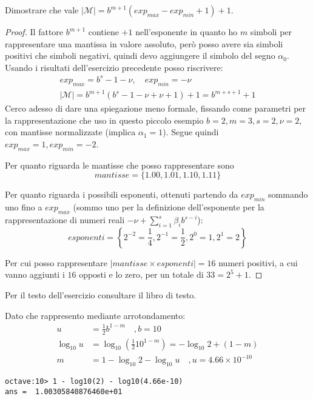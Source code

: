 \begin{exercise}
Dimostrare che vale $|\mathcal{M}| = b^{m+1}(exp_{max} - exp_{min} + 1) + 1$.
\end{exercise}
\begin{proof}
Il fattore $b^{m+1}$ contiene $+1$ nell'esponente in quanto ho $m$ simboli per
rappresentare una mantissa in valore assoluto, per\`o posso avere sia simboli positivi
che simboli negativi, quindi devo aggiungere il simbolo del segno $\alpha_{0}$.
Usando i risultati dell'esercizio precedente posso riscrivere:
\begin{displaymath}
\begin{split}
	exp_{max} = b^{s} - 1 - \nu, \quad exp_{min} = -\nu \\
	|\mathcal{M}| = b^{m+1}(b^{s} - 1 - \nu + \nu + 1) + 1 = b^{m+s+1} + 1
\end{split}
\end{displaymath}
Cerco adesso di dare una spiegazione meno formale, fissando come parametri per
la rappresentazione che uso in questo piccolo esempio $b = 2, m = 3, s = 2, \nu = 2$,
con mantisse normalizzate (implica $\alpha_{1} = 1$).
Segue quindi $exp_{max} = 1, exp_{min} = -2$. 

Per quanto riguarda le mantisse che posso rappresentare sono 
$$mantisse = \lbrace 1.00, 1.01, 1.10, 1.11 \rbrace$$

Per quanto riguarda i possibili esponenti, ottenuti partendo da $exp_{min}$ sommando
uno fino a $exp_{max}$ (sommo uno per la definizione dell'esponente per la rappresentazione
di numeri reali $-\nu + \sum_{i = 1}^{s}{\beta_{i} b^{s - i}}$):
$$esponenti = \left \lbrace 2^{-2} = \frac{1}{4}, 2^{-1} = \frac{1}{2},
		2^{0} = 1, 2^{1} = 2 \right \rbrace$$

Per cui posso rappresentare $|mantisse \times esponenti| = 16$ numeri positivi, 
a cui vanno aggiunti i $16$ opposti e lo zero, per un totale di $33 = 2^{5} + 1$.
\end{proof}

\begin{exercise}[1.8]
Per il testo dell'esercizio consultare il libro di testo.
\end{exercise}
Dato che rappresento mediante arrotondamento:
\begin{displaymath}
\begin{split}
u &= \frac{1}{2}b^{1-m} \quad , b = 10 \\
\log_{10}{u} &= \log_{10}{\left ( \frac{1}{2}10^{1-m} \right )} = -\log_{10}{2} + (1 - m) \\
m &= 1 - \log_{10}{2} - \log_{10}{u} \quad , u = 4.66 \times 10^{-10}
\end{split}
\end{displaymath}
\begin{lstlisting}
octave:10> 1 - log10(2) - log10(4.66e-10)
ans =  1.00305840876460e+01
\end{lstlisting}

